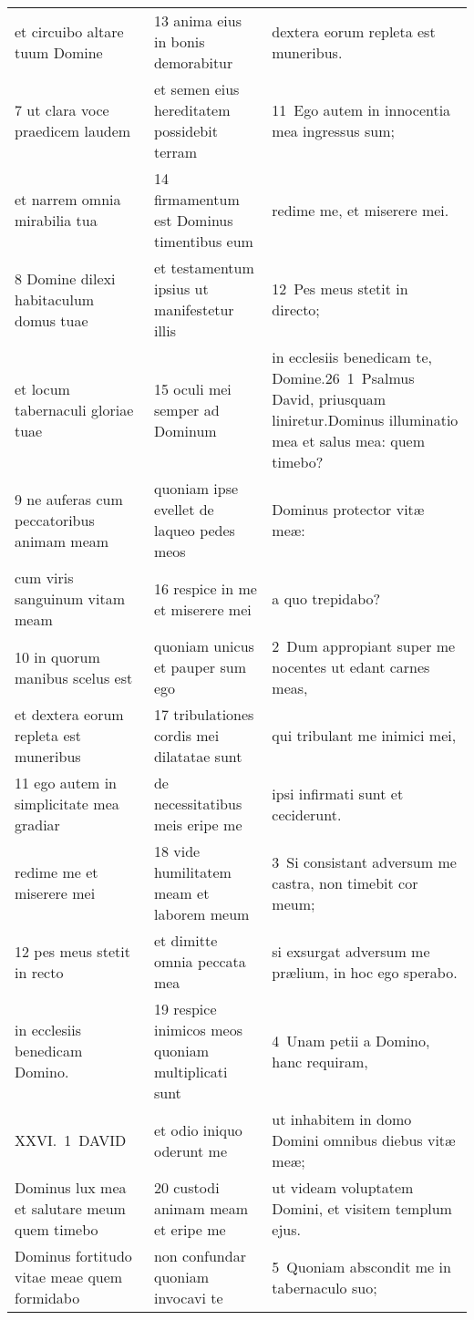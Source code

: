 \documentclass{article}
\begin{document}
\begin{longtable}{@{}p{}p{}p{}@{}}
et circuibo altare tuum Domine	&	13 anima eius in bonis demorabitur	&	dextera eorum repleta est muneribus.	\\
7 ut clara voce praedicem laudem	&	et semen eius hereditatem possidebit terram	&	11 Ego autem in innocentia mea ingressus sum;	\\
et narrem omnia mirabilia tua	&	14 firmamentum est Dominus timentibus eum	&	redime me, et miserere mei.	\\
8 Domine dilexi habitaculum domus tuae	&	et testamentum ipsius ut manifestetur illis	&	12 Pes meus stetit in directo;	\\
et locum tabernaculi gloriae tuae	&	15 oculi mei semper ad Dominum	&	in ecclesiis benedicam te, Domine.26 1 Psalmus David, priusquam liniretur.Dominus illuminatio mea et salus mea: quem timebo?	\\
9 ne auferas cum peccatoribus animam meam	&	quoniam ipse evellet de laqueo pedes meos	&	Dominus protector vitæ meæ:	\\
cum viris sanguinum vitam meam	&	16 respice in me et miserere mei	&	a quo trepidabo?	\\
10 in quorum manibus scelus est	&	quoniam unicus et pauper sum ego	&	2 Dum appropiant super me nocentes ut edant carnes meas,	\\
et dextera eorum repleta est muneribus	&	17 tribulationes cordis mei dilatatae sunt	&	qui tribulant me inimici mei,	\\
11 ego autem in simplicitate mea gradiar	&	de necessitatibus meis eripe me	&	ipsi infirmati sunt et ceciderunt.	\\
redime me et miserere mei	&	18 vide humilitatem meam et laborem meum	&	3 Si consistant adversum me castra, non timebit cor meum;	\\
12 pes meus stetit in recto	&	et dimitte omnia peccata mea	&	si exsurgat adversum me prælium, in hoc ego sperabo.	\\
in ecclesiis benedicam Domino.	&	19 respice inimicos meos quoniam multiplicati sunt	&	4 Unam petii a Domino, hanc requiram,	\\
XXVI. 1 DAVID	&	et odio iniquo oderunt me	&	ut inhabitem in domo Domini omnibus diebus vitæ meæ;	\\
Dominus lux mea et salutare meum quem timebo	&	20 custodi animam meam et eripe me	&	ut videam voluptatem Domini, et visitem templum ejus.	\\
Dominus fortitudo vitae meae quem formidabo	&	non confundar quoniam invocavi te	&	5 Quoniam abscondit me in tabernaculo suo;	\\

\end{longtable}
\end{document}
